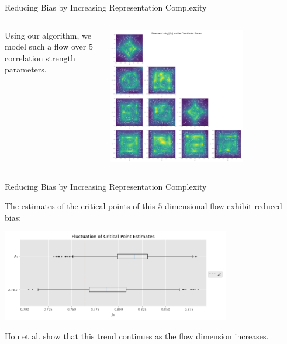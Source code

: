 \documentclass[aspectratio=169, 12pt]{beamer}
\begin{document}
\begin{frame}{Reducing Bias by Increasing Representation Complexity}

    \begin{columns}
        \begin{column}{.4\textwidth}
            
            Using our algorithm, we model such a flow over $5$ correlation strength parameters. 
            
        \end{column}
        \begin{column}{.6\textwidth}
            \begin{center}
                \includegraphics[width=0.7\textwidth]{images/a1e-flows.png}
            \end{center}
        \end{column}
    \end{columns}
    
\end{frame}

\begin{frame}{Reducing Bias by Increasing Representation Complexity}

    The estimates of the critical points of this $5$-dimensional flow exhibit reduced bias:
    
    \begin{center}
        \includegraphics[width=0.75\textwidth]{images/a1-a1e-critical-points-boxplot.png}
    \end{center}

    Hou et al. show that this trend continues as the flow dimension increases. 

\end{frame}
\end{document}
